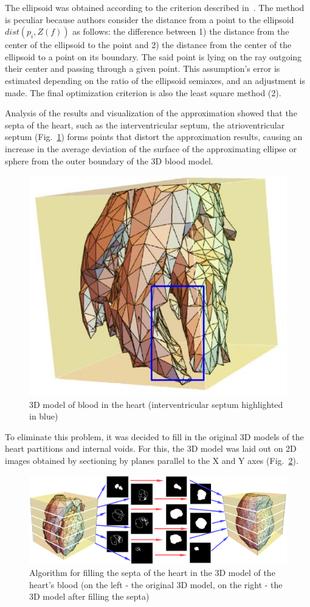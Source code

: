 \documentclass[conference]{IEEEtran}
\begin{document}
The ellipsoid was obtained according to the criterion described in~\cite{Bookstein1979}.
The method is peculiar because authors consider the distance from a point to the
ellipsoid $dist(p_i, Z(f))$ as follows: the difference between 1) the
distance from the center of the ellipsoid to the point and 2) the distance from
the center of the ellipsoid to a point on its boundary. The said point is lying
on the ray outgoing their center and passing through a given point. This
assumption's error is estimated depending on the ratio of the ellipsoid
semiaxes, and an adjustment is made. The final optimization criterion is also
the least square method (2).

Analysis of the results and visualization of the approximation showed that the
septa of the heart, such as the interventricular septum,
the atrioventricular septum (Fig.~\ref{fig:wall}) forms points that distort
the approximation results, causing an increase in the average deviation of the
surface of the approximating ellipse or sphere from the outer boundary of the 3D
blood model.
\begin{figure}[tbph]
    \centering
    \includegraphics[width=0.6\linewidth]{fig/wall}
    \caption{3D model of blood in the heart (interventricular septum highlighted in blue)}
    \label{fig:wall}
\end{figure}
To eliminate this problem, it was decided to fill in the original 3D models of
the heart partitions and internal voids. For this, the 3D model was laid out on
2D images obtained by sectioning by planes parallel to the X and Y axes (Fig.~\ref{fig:algo}).
\begin{figure}[tbph]
    \centering
    \includegraphics[width=\linewidth]{fig/algo}
    \caption{Algorithm for filling the septa of the heart in the 3D model of the heart's blood
    (on the left - the original 3D model, on the right - the 3D model after filling the septa)}
    \label{fig:algo}
\end{figure}
\end{document}
